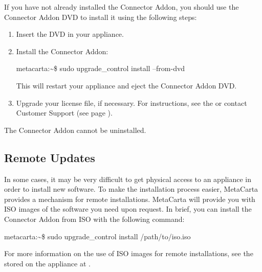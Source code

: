 %
%

If you have not already installed the Connector Addon, you should use
the Connector Addon DVD to install it using the following steps:

\begin{enumerate}

\item Insert the DVD in your appliance.

\item Install the Connector Addon:

\begin{console}

metacarta:\~{}\$ sudo upgrade\_control install --from-dvd 

\end{console}

This will restart your appliance and eject the Connector Addon DVD.

\item Upgrade your license file, if necessary. For instructions,
see the  or 
contact Customer Support (see page \pageref{SupportContact}).

\end{enumerate}

The Connector Addon cannot be uninstalled.

\subsection{Remote Updates}

In some cases, it may be very difficult to get physical access to an
appliance in order to install new software. To make the installation
process easier, MetaCarta provides a mechanism for remote
installations.  MetaCarta will provide you with ISO images of the
software you need upon request.  In brief, you can install the 
Connector Addon from ISO with the following command:

\begin{console}

metacarta:\~{}\$ sudo upgrade\_control install /path/to/iso.iso

\end{console}

For more information on the use of ISO
images for remote installations, see the  stored on the appliance at
.
